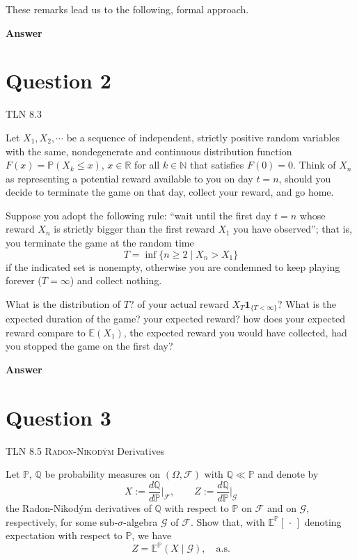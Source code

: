 \documentclass[letterpaper]{article}
\begin{document}
		\indent These remarks lead us to the following, formal approach.
		
		\textbf{Answer}
		
		\clearpage
		
		\section{Question 2}
		
		{\color{deepred} TLN 8.3}
		
		Let $X_1, X_2, \cdots$ be a sequence of independent, strictly positive random variables with the same, nondegenerate and continuous distribution function $F(x) = \mathbb{P}(X_k \leq x)$, $x \in \mathbb{R}$ for all $k \in \mathbb{N}$ that satisfies $F(0) = 0$. Think of $X_n$ as representing a potential reward available to you on day $t = n$, should you decide to terminate the game on that day, collect your reward, and go home.
		
		\indent Suppose you adopt the following rule: ``wait until the first day $t = n$ whose reward $X_n$ is strictly bigger than the first reward $X_1$ you have observed''; that is, you terminate the game at the random time
		\[
		T = \inf\{n \geq 2 \mid X_n > X_1\}
		\]
		if the indicated set is nonempty, otherwise you are condemned to keep playing forever ($T = \infty$) and collect nothing.
		
		\indent What is the distribution of $T$? of your actual reward $X_T \mathbf{1}_{\{T < \infty\}}$? What is the expected duration of the game? your expected reward? how does your expected reward compare to $\mathbb{E}(X_1)$, the expected reward you would have collected, had you stopped the game on the first day?
		
		
		
		\textbf{Answer}
		
		\clearpage
		
		\section{Question 3}
		
		{\color{deepred} TLN 8.5 \textsc{Radon-Nikod\'{y}m} Derivatives}
		
		Let $\mathbb{P}$, $\mathbb{Q}$ be probability measures on $(\Omega, \mathcal{F})$ with $\mathbb{Q} \ll \mathbb{P}$ and denote by
		\[
		X := \frac{d\mathbb{Q}}{d\mathbb{P}}\bigg|_{\mathcal{F}}, \qquad Z := \frac{d\mathbb{Q}}{d\mathbb{P}}\bigg|_{\mathcal{G}}
		\]
		the Radon-Nikod\'{y}m derivatives of $\mathbb{Q}$ with respect to $\mathbb{P}$ on $\mathcal{F}$ and on $\mathcal{G}$, respectively, for some sub-$\sigma$-algebra $\mathcal{G}$ of $\mathcal{F}$. Show that, with $\mathbb{E}^{\mathbb{P}}[\,\cdot\,]$ denoting expectation with respect to $\mathbb{P}$, we have
		\begin{equation}
			Z = \mathbb{E}^{\mathbb{P}}(X \mid \mathcal{G}), \quad \text{a.s.} \tag{8.25}
		\end{equation}
		
\end{document}
